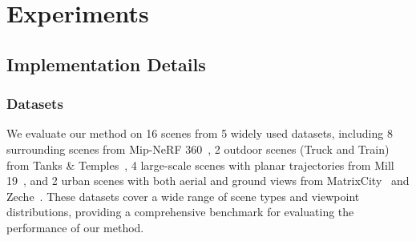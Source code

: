 \documentclass[lettersize,journal]{IEEEtran}
\begin{document}
\section{Experiments\label{sec:experiments}}
 
\subsection{Implementation Details}

\subsubsection{Datasets}

We evaluate our method on 16 scenes from 5 widely used datasets, including
8 surrounding scenes 
from Mip-NeRF 360~\cite{mipnerf360},
2 outdoor scenes (Truck and Train) from Tanks \& Temples~\cite{tankstemples},
4 large-scale scenes with planar trajectories from Mill 19~\cite{meganerf},
and 2 urban scenes with both aerial and ground views from MatrixCity~\cite{matrixcity} and Zeche~\cite{isprs}.
These datasets cover a wide range of scene types and viewpoint distributions, providing a comprehensive benchmark for evaluating the performance of our method.
\end{document}
